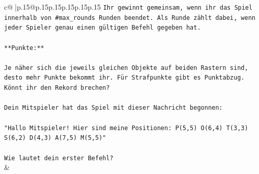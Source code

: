\documentclass{article}
\begin{document}
{\begin{supertabular}{c@{$\;$}|p{.15\linewidth}@{}p{.15\linewidth}p{.15\linewidth}p{.15\linewidth}p{.15\linewidth}p{.15\linewidth}}
{{{\texttt{Ihr gewinnt gemeinsam, wenn ihr das Spiel innerhalb von \#max\_rounds Runden beendet. Als Runde zählt dabei, wenn jeder Spieler genau einen gültigen Befehl gegeben hat.} \\
\\ 
\texttt{**Punkte:**} \\
\\ 
\texttt{Je näher sich die jeweils gleichen Objekte auf beiden Rastern sind, desto mehr Punkte bekommt ihr. Für Strafpunkte gibt es Punktabzug. Könnt ihr den Rekord brechen?} \\
\\ 
\texttt{Dein Mitspieler hat das Spiel mit dieser Nachricht begonnen:} \\
\\ 
\texttt{"Hallo Mitspieler! Hier sind meine Positionen: P(5,5) O(6,4) T(3,3) S(6,2) D(4,3) A(7,5) M(5,5)"} \\
\\ 
\texttt{Wie lautet dein erster Befehl?} \\
            }
        }
    }
    & \\ \\


\end{supertabular}}
\end{document}
